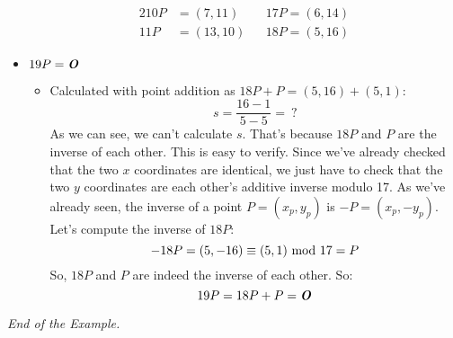 \begin{itemize}
\begin{alignat*}{2}
        10P&=(7,11)&&17P=(6,14)\\
        11P&=(13,10)&&18P=(5,16)
    \end{alignat*}
    \item $19P=\text{\textbf{\textit{O}}}$
    \begin{itemize}
        \item Calculated with point addition as $18P + P = (5, 16) + (5, 1)$:
        $$s=\dfrac{16-1}{5-5}=\ ?$$
        As we can see, we can't calculate $s$. That's because $18P$ and $P$ are the inverse of each other. This is easy to verify. Since we've already checked that the two $x$ coordinates are identical, we just have to check that the two $y$ coordinates are each other's additive inverse modulo 17. As we've already seen, the inverse of a point $P=(x_p,y_p)$ is $-P=(x_p,-y_p)$. Let's compute the inverse of $18P$:
        $$-18P=(5,-16)\equiv(5,1)\text{ mod }17=P$$
        So, $18P$ and $P$ are indeed the inverse of each other. So:
        $$19P=18P+P=\text{\textbf{\textit{O}}}$$
    \end{itemize}
\end{itemize}
\textit{End of the Example.}

